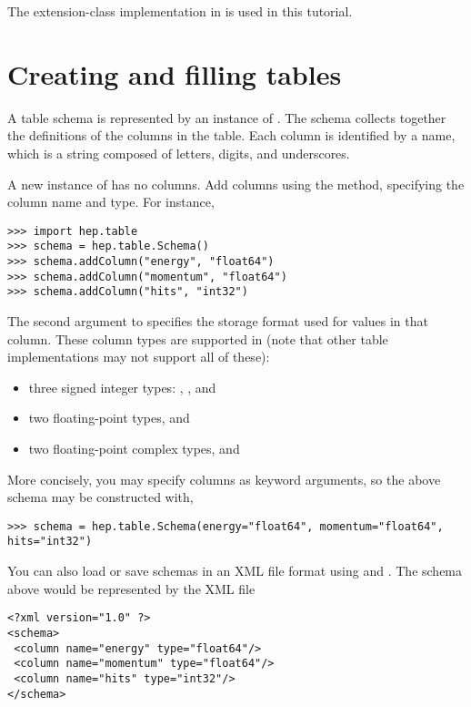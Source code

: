 The extension-class implementation in  is used in this
tutorial. 

\section{Creating and filling tables}

A table schema is represented by an instance of
.  The schema collects together the definitions of the columns in the table.  Each column is identified by a name, which is
a string composed of letters, digits, and underscores.  

A new instance of  has no columns.  Add columns using the
 method, specifying the column name and type.  For instance, 
\begin{verbatim}
>>> import hep.table
>>> schema = hep.table.Schema()
>>> schema.addColumn("energy", "float64")
>>> schema.addColumn("momentum", "float64")
>>> schema.addColumn("hits", "int32")
\end{verbatim}

The second argument to  specifies the storage format
used for values in that column.  These column types are supported in
 (note that other table implementations may not support
all of these):
\begin{itemize}
 \item three signed integer types: , ,
 and 

 \item two floating-point types,  and

 \item two floating-point complex types,  and
\end{itemize}

More concisely, you may specify columns as keyword arguments, so the
above schema may be constructed with,
\begin{verbatim}
>>> schema = hep.table.Schema(energy="float64", momentum="float64", hits="int32")
\end{verbatim}

You can also load or save schemas in an XML file format using
 and .
The schema above would be represented by the XML file
\begin{verbatim}
<?xml version="1.0" ?>
<schema>
 <column name="energy" type="float64"/>
 <column name="momentum" type="float64"/>
 <column name="hits" type="int32"/>
</schema>
\end{verbatim}

